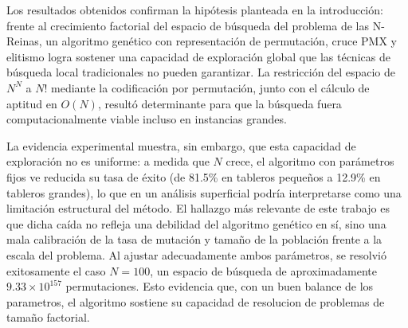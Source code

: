 \documentclass[11pt,a4paper,twocolumn]{article}
\begin{document}
Los resultados obtenidos confirman la hipótesis planteada en la introducción: frente al crecimiento factorial del espacio de búsqueda del problema de las N-Reinas, un algoritmo genético con representación de permutación, cruce PMX y elitismo logra sostener una capacidad de exploración global que las técnicas de búsqueda local tradicionales no pueden garantizar. La restricción del espacio de $N^N$ a $N!$ mediante la codificación por permutación, junto con el cálculo de aptitud en $O(N)$, resultó determinante para que la búsqueda fuera computacionalmente viable incluso en instancias grandes.

La evidencia experimental muestra, sin embargo, que esta capacidad de exploración no es uniforme: a medida que $N$ crece, el algoritmo con parámetros fijos ve reducida su tasa de éxito (de 81.5\% en tableros pequeños a 12.9\% en tableros grandes), lo que en un análisis superficial podría interpretarse como una limitación estructural del método. El hallazgo más relevante de este trabajo es que dicha caída no refleja una debilidad del algoritmo genético en sí, sino una mala calibración de la tasa de mutación y tamaño de la población frente a la escala del problema. Al ajustar adecuadamente ambos parámetros, se resolvió exitosamente el caso $N=100$, un espacio de búsqueda de aproximadamente $9.33 \times 10^{157}$ permutaciones. Esto evidencia que, con un buen balance de los parametros, el algoritmo sostiene su capacidad de resolucion de problemas de tamaño factorial. 
\end{document}
